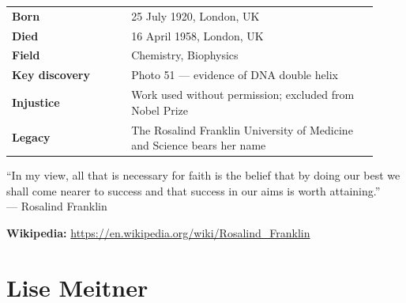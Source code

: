 \documentclass[12pt,a4paper]{article}
\makeatletter
\newcommand{\keyfacts}[1]{%
  \begin{tcolorbox}[factbox, title={Key Facts}]
  \begin{tabular}{@{}p{0.3\linewidth}p{0.62\linewidth}@{}}
  #1
  \end{tabular}
  \end{tcolorbox}
}
\newcommand{\pullquote}[2]{%
  \begin{tcolorbox}[quotebox]
  ``#1''\\[4pt]
  {\small\normalfont\color{medgray}--- #2}
  \end{tcolorbox}
}
\makeatother
\begin{document}
\keyfacts{
\textbf{Born} & 25 July 1920, London, UK\\[3pt]
\textbf{Died} & 16 April 1958, London, UK\\[3pt]
\textbf{Field} & Chemistry, Biophysics\\[3pt]
\textbf{Key discovery} & Photo 51 — evidence of DNA double helix\\[3pt]
\textbf{Injustice} & Work used without permission; excluded from Nobel Prize\\[3pt]
\textbf{Legacy} & The Rosalind Franklin University of Medicine and Science bears her name\\
}

\pullquote{In my view, all that is necessary for faith is the belief that by doing our best we shall come nearer to success and that success in our aims is worth attaining.}{Rosalind Franklin}

\vspace{6pt}
\textbf{Wikipedia:} \url{https://en.wikipedia.org/wiki/Rosalind_Franklin}

\newpage

\section{Lise Meitner}
\end{document}
